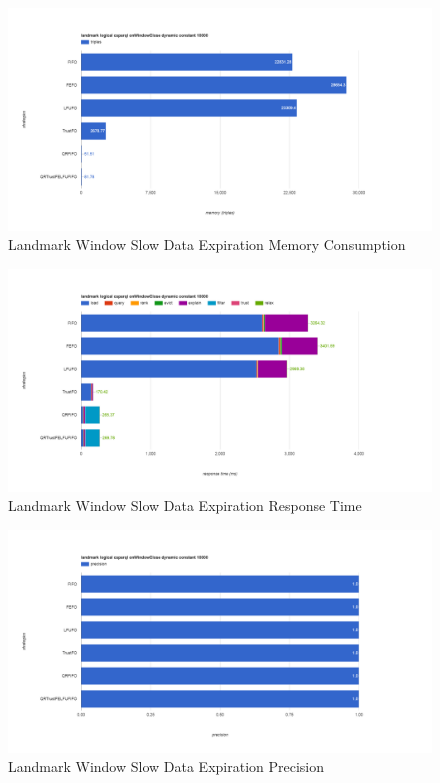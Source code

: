\begin{figure}[!htbp]
	\centering
    \includegraphics[width=6.5in]{img/app3-land-slow-m.png}
    \caption{Landmark Window Slow Data Expiration Memory Consumption}
\end{figure}
\begin{figure}[!htbp]
	\centering
    \includegraphics[width=6.5in]{img/app3-land-slow-r.png}
    \caption{Landmark Window Slow Data Expiration Response Time}
\end{figure}
\begin{figure}[!htbp]
	\centering
    \includegraphics[width=6.5in]{img/app3-land-slow-p.png}
    \caption{Landmark Window Slow Data Expiration Precision}
\end{figure}
